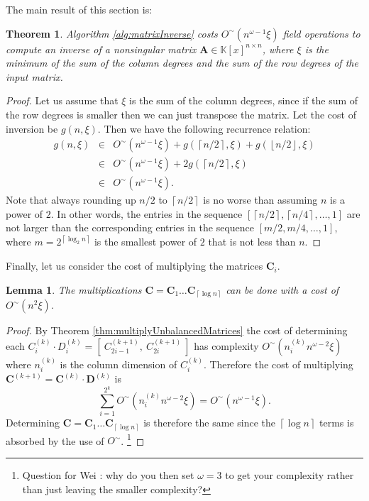 \documentclass[a4paper,11pt]{article}
\newtheorem{thm}{Theorem}
\newtheorem{lem}{Lemma}
\begin{document}
The main result of this section is:

\begin{thm}
\label{thm:inverseCost}
Algorithm \ref{alg:matrixInverse} costs $O^{\sim}\left(n^{\omega-1}\xi\right)$
field operations to compute an inverse of a nonsingular matrix $\mathbf{A}\in\mathbb{K}\left[x\right]^{n\times n}$,
where $\xi$ is the minimum of the sum of the column degrees and the
sum of the row degrees of the input matrix.\end{thm}
\begin{proof}
Let us assume that $\xi$ is the sum of the column degrees, since if the sum of the row degrees is smaller then we can just transpose the matrix. Let the cost of inversion be $g(n,\xi)$. Then we have the following recurrence
relation:
\begin{eqnarray*}
g(n,\xi) & \in & O^{\sim}(n^{\omega-1}\xi)+g(\left\lceil n/2\right\rceil ,\xi)+g(\left\lfloor n/2\right\rfloor ,\xi)\\
 & \in & O^{\sim}(n^{\omega-1}\xi)+2g(\left\lceil n/2\right\rceil ,\xi)\\
 & \in & O^{\sim}(n^{\omega-1}\xi).
\end{eqnarray*}
Note that always rounding up $n/2$ to $\left\lceil n/2\right\rceil $
is no worse than assuming $n$ is a power of $2$. In other words,
the entries in the sequence $\left[\left\lceil n/2\right\rceil ,\left\lceil n/4\right\rceil ,\dots,1\right]$
are not larger than the corresponding entries in the sequence $\left[m/2,m/4,\dots,1\right]$,
where $m =2^{\left\lceil \log_{2}n\right\rceil }$ is the smallest power of $2$ that is not less than $n$.
\end{proof}

Finally, let us consider the cost of multiplying the matrices $\mathbf{C}_i$.

\begin{lem}\label{Cmultiply}
The multiplications $\mathbf{C}=\mathbf{C}_{1}\dots\mathbf{C}_{\left\lceil \log n\right\rceil }$
can be done with a cost of $O^{\sim}(n^{2}\xi)$.
\end{lem}
\begin{proof}
By Theorem \ref{thm:multiplyUnbalancedMatrices} the cost of determining each 
$C_i^{(k)} \cdot D_i^{(k)} = [ ~ C_{2i-1}^{(k+1)} , ~ C_{2i}^{(k+1)} ~ ]$ has complexity
$O^{\sim}(n_i^{(k)} n^{\omega-2} \xi)$ where $n_i^{(k)}$ is the column dimension of $C_i^{(k)}$.
Therefore the cost of multiplying
$\mathbf{C}^{(k+1)} = \mathbf{C}^{(k)} \cdot \mathbf{D}^{(k)}$ is
$$
\sum_{i=1}^{2^k} O^{\sim}(n_i^{(k)} n^{\omega-2} \xi) = O^{\sim}(n^{\omega-1}\xi).
$$
Determining $\mathbf{C}=\mathbf{C}_{1}\dots\mathbf{C}_{\left\lceil \log n\right\rceil }$ is therefore
the same since the $\left\lceil \log n\right\rceil$ terms is absorbed by the use of $O^{\sim}$.
\footnote{Question for Wei : why do you then set $\omega = 3$ to get your complexity rather than just leaving the smaller complexity?}
\end{proof}
\end{document}
